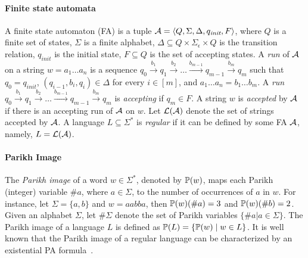 \paragraph{Finite state automata}
A finite state automaton (FA) is a tuple 
$\mathcal{A}=\langle Q,\Sigma,\Delta, q_{\textit{init}}, F\rangle$, 
where $Q$ is a finite set of states, 
$\Sigma$ is a finite alphabet,
$\Delta\subseteq Q\times \Sigma_\epsilon\times Q$ is the transition relation, 
$q_{\textit{init}}$ is the initial state, $F \subseteq Q$ is the set of accepting states. 
A \emph{run} of $\mathcal{A}$ on a string $w = a_1 \ldots a_n$ is a sequence $q_0 \xrightarrow{b_1} q_1  \xrightarrow{b_2}  \ldots   \xrightarrow{b_{m-1}}  q_{m-1} \xrightarrow{b_m} q_m$ such that $q_0 = q_{\textit{init}}$, $(q_{i-1}, b_i, q_i) \in \Delta$ for every $i \in [m]$, and $a_1 \ldots a_n = b_1 \ldots b_m$. A \emph{run} $q_0 \xrightarrow{b_1} q_1  \xrightarrow{b_2}  \ldots   \xrightarrow{b_{m-1}}  q_{m-1} \xrightarrow{b_m} q_m$ is \emph{accepting} if $q_m  \in F$. A string $w$ is \emph{accepted} by $\mathcal{A}$ if there is an accepting run of $\mathcal{A}$ on $w$. Let $\mathcal{L}(\mathcal{A})$ denote the set of strings accepted by $\mathcal{A}$. A language $L \subseteq \Sigma^*$ is \emph{regular} if it can be defined by some FA $\mathcal{A}$, namely, $L = \mathcal{L}(\mathcal{A})$.

\paragraph{Parikh Image}
%
The \emph{Parikh image} of a word $w \in \Sigma^*$, denoted by $\mathbb{P}(w)$, maps each Parikh (integer) variable $\#a$, where $a \in \Sigma$, to the number of occurrences of $a$ in $w$. 
For instance, let $\Sigma = \{a,b\}$ and $w= aabba$,
then $\mathbb{P}(w)(\#a)=3$ and $\mathbb{P}(w)(\#b)=2$.
Given an alphabet $\Sigma$, let $\#\Sigma$ denote the set of Parikh variables $\{\#a | a \in \Sigma\}$. 
The Parikh image of a language $L$ is defined as $\mathbb{P}(L) = \{\mathbb{P}(w) \mid w \in L\}$. It is well known that the Parikh image of a regular language can be characterized by an existential PA formula~\cite{SSMH04}.


